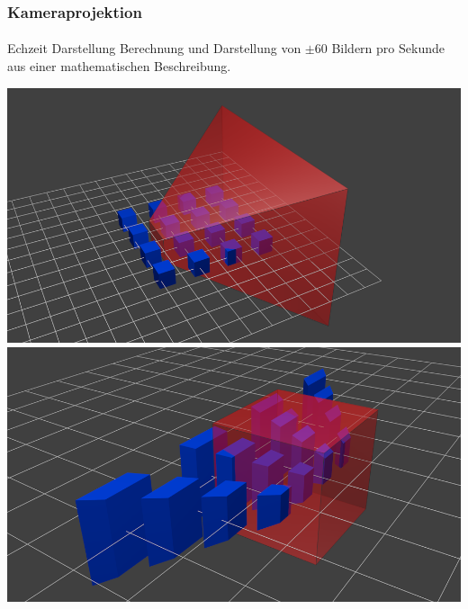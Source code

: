\documentclass{beamer}
\begin{document}
\begin{frame}
    \frametitle{Kameraprojektion}
\framesubtitle{}
    \begin{block}{Echzeit Darstellung}
Berechnung und Darstellung von $\pm 60$ Bildern pro Sekunde aus einer mathematischen Beschreibung.
\end{block}

\includegraphics[scale=0.16]{images/nondeforme}
 \includegraphics[scale=0.16]{images/deform}

\end{frame}
\end{document}
